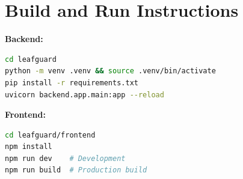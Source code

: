 \documentclass[11pt,a4paper,oneside]{report}
\begin{document}
\section{Build and Run Instructions}

\textbf{Backend:}
\begin{lstlisting}[language=bash, caption={Backend Setup}]
cd leafguard
python -m venv .venv && source .venv/bin/activate
pip install -r requirements.txt
uvicorn backend.app.main:app --reload
\end{lstlisting}

\textbf{Frontend:}
\begin{lstlisting}[language=bash, caption={Frontend Setup}]
cd leafguard/frontend
npm install
npm run dev    # Development
npm run build  # Production build
\end{lstlisting}


\printbibliography[heading=bibintoc, title={References}]
\end{document}
